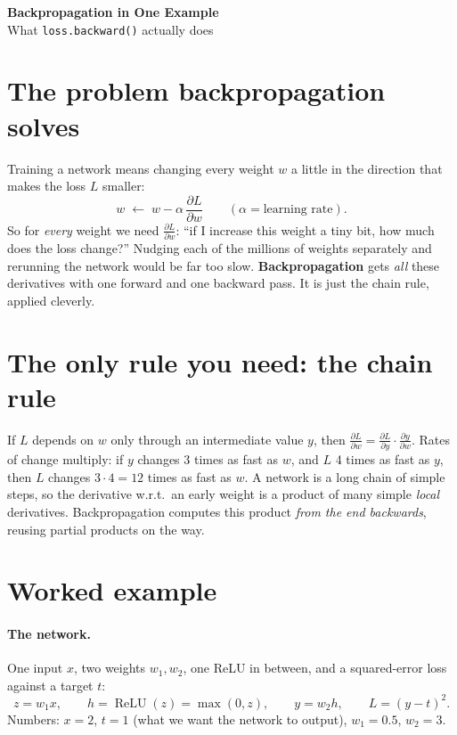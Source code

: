 \documentclass[11pt,a4paper]{article}
\DeclareMathOperator{\relu}{ReLU}
\newcommand{\pd}[2]{\frac{\partial #1}{\partial #2}}
\newcommand{\code}[1]{\texttt{#1}}
\begin{document}
\begin{center}
  {\LARGE\bfseries Backpropagation in One Example}\\[0.3em]
  {\large What \code{loss.backward()} actually does}
\end{center}

\section{The problem backpropagation solves}

Training a network means changing every weight $w$ a little in the direction that makes the loss $L$ smaller:
\[
  w \;\gets\; w - \alpha\,\pd{L}{w}\qquad(\alpha=\text{learning rate}).
\]
So for \emph{every} weight we need $\pd{L}{w}$: \enquote{if I increase this weight a tiny bit, how much does the loss change?}
Nudging each of the millions of weights separately and rerunning the network would be far too slow.
\textbf{Backpropagation} gets \emph{all} these derivatives with one forward and one backward pass. It is just the chain rule, applied cleverly.

\section{The only rule you need: the chain rule}

If $L$ depends on $w$ only through an intermediate value $y$, then $\displaystyle\pd{L}{w} = \pd{L}{y}\cdot\pd{y}{w}$.
Rates of change multiply: if $y$ changes 3 times as fast as $w$, and $L$ 4 times as fast as $y$, then $L$ changes $3\cdot4=12$ times as fast as $w$.
A network is a long chain of simple steps, so the derivative w.r.t.\ an early weight is a product of many simple \emph{local} derivatives. Backpropagation computes this product \emph{from the end backwards}, reusing partial products on the way.

\section{Worked example}

\paragraph{The network.} One input $x$, two weights $w_1,w_2$, one ReLU in between, and a squared-error loss against a target $t$:
\[
  z = w_1 x,\qquad h = \relu(z)=\max(0,z),\qquad y = w_2 h,\qquad L = (y-t)^2 .
\]
Numbers: $x=2$, $t=1$ (what we want the network to output), $w_1=0.5$, $w_2=3$.
\end{document}
